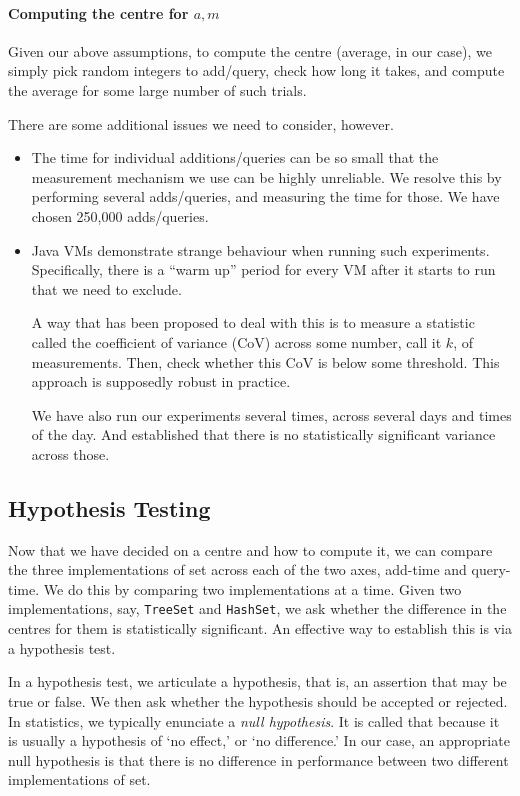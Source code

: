 \paragraph{Computing the centre for $a, m$} Given our above
assumptions, to compute the centre (average, in our case), we
simply pick random integers to add/query, check how long it
takes, and compute the average for some large number of such
trials.

There are some additional issues we need to consider, however.

\begin{itemize}
    \item The time for individual additions/queries can be
	so small that the measurement mechanism we use can
	be highly unreliable. We resolve this by performing
	several adds/queries, and measuring the time for those.
	We have chosen 250,000 adds/queries.

    \item Java VMs demonstrate strange behaviour when running
	such experiments. Specifically, there is a ``warm up''
	period for every VM after it starts to run
	that we need to exclude.

	A way that has been proposed to deal with this \cite{xxx}
	is to measure a statistic called the coefficient
	of variance (CoV) across some number, call it
	$k$, of measurements. Then, check whether this
	CoV is below some threshold. This approach is
	supposedly robust in practice.

	We have also run our experiments several times, across
	several days and times of the day. And established that
	there is no statistically significant variance across
	those.
\end{itemize}

\subsection*{Hypothesis Testing}\label{sec:statistics:hypo}
Now that we have decided on a centre and how to compute it,
we can compare the three implementations of set across
each of the two axes, add-time and query-time.
We do this by comparing two implementations at a time.
Given two implementations, say, \texttt{TreeSet} and \texttt{HashSet},
we ask whether the difference in the centres for them
is statistically significant. An effective way to establish
this is via a hypothesis test.

In a hypothesis test, we articulate a hypothesis, that is,
an assertion that may be true or false. We then ask whether
the hypothesis should be accepted or rejected. In statistics,
we typically enunciate a \emph{null hypothesis}.
It is called that because it is usually a hypothesis of
`no effect,' or `no difference.' In our case, an appropriate
null hypothesis is that there is no difference in performance
between two different implementations of set.


